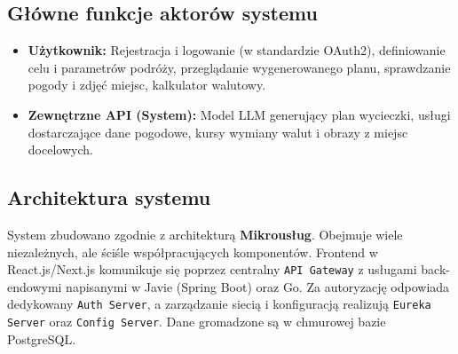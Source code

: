 \documentclass[11pt,a4paper]{article}
\begin{document}
\subsection{Główne funkcje aktorów systemu}
\begin{itemize}
  \item \textbf{Użytkownik:} Rejestracja i logowanie (w standardzie OAuth2), definiowanie celu i parametrów podróży, przeglądanie wygenerowanego planu, sprawdzanie pogody i zdjęć miejsc, kalkulator walutowy.
  \item \textbf{Zewnętrzne API (System):} Model LLM generujący plan wycieczki, usługi dostarczające dane pogodowe, kursy wymiany walut i obrazy z miejsc docelowych.
\end{itemize}

\subsection{Architektura systemu}
System zbudowano zgodnie z architekturą \textbf{Mikrousług}. Obejmuje wiele niezależnych, ale ściśle współpracujących komponentów. Frontend w React.js/Next.js komunikuje się poprzez centralny \texttt{API Gateway} z usługami back-endowymi napisanymi w Javie (Spring Boot) oraz Go. Za autoryzację odpowiada dedykowany \texttt{Auth Server}, a zarządzanie siecią i konfiguracją realizują \texttt{Eureka Server} oraz \texttt{Config Server}. Dane gromadzone są w chmurowej bazie PostgreSQL.
\end{document}
